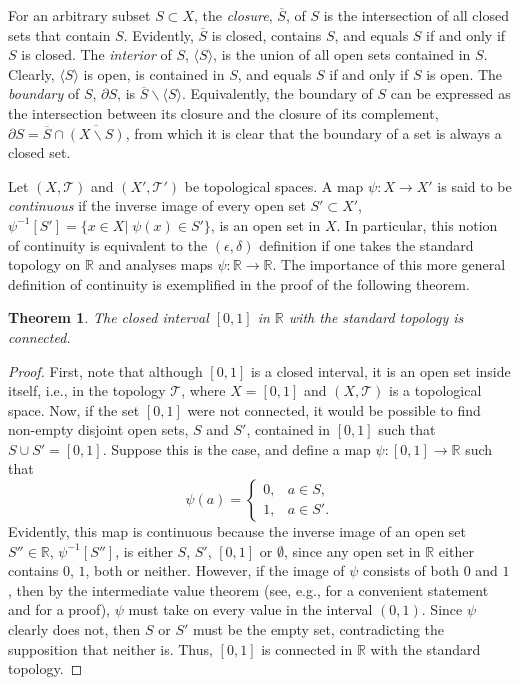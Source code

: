 \documentclass[
12pt,		%
openright,	%
twoside,  %
a4paper,			%
chapter=TITLE,		%
english,			%
french,				%
spanish,			%
brazil				%
]{USPSC-classe/USPSC}
\newtheorem{theorem}{Theorem}[section]
\begin{document}
\begin{apendicesenv}
For an arbitrary subset $S\subset X$, the \textit{closure}, $\overline{S}$, of $S$ is the intersection of all closed sets that contain $S$. Evidently, $\overline{S}$ is closed, contains $S$, and equals $S$ if and only if $S$ is closed. The \textit{interior} of $S$, $\langle S\rangle$, is the union of all open sets contained in $S$. Clearly, $\langle S\rangle$ is open, is contained in $S$, and equals $S$ if and only if $S$ is open. The \textit{boundary} of $S$, $\partial S$, is $\overline{S}\backslash\langle S\rangle$. Equivalently, the boundary of $S$ can be expressed as the intersection between its closure and the closure of its complement, $\partial S=\overline{S}\cap\overline{(X\backslash S)}$, from which it is clear that the boundary of a set is always a closed set.

Let $(X,\mathscr{T})$ and $(X',\mathscr{T}')$ be topological spaces. A map $\psi:X\to X'$ is said to be \textit{continuous} if the inverse image of every open set $S'\subset X'$, $\psi^{-1}[S']=\{x\in X|\;\psi(x)\in S'\}$, is an open set in $X$. In particular, this notion of continuity is equivalent to the $(\epsilon,\delta)$ definition \cite{Leithold1976} if one takes the standard topology on $\mathbb{R}$ and analyses maps $\psi:\mathbb{R}\to\mathbb{R}$. The importance of this more general definition of continuity is exemplified in the proof of the following theorem.

\begin{theorem}\label{01}
    The closed interval $[0,1]$ in $\mathbb{R}$ with the standard topology is connected.
\end{theorem}
\begin{proof}
    First, note that although  $[0,1]$ is a closed interval, it is an open set inside itself, i.e., in the topology $\mathscr{T}$, where $X=[0,1]$ and $(X,\mathscr{T})$ is a topological space. Now, if the set $[0,1]$ were not connected, it would be possible to find non-empty disjoint open sets, $S$ and $S'$, contained in $[0,1]$ such that $S\cup S'=[0,1]$. Suppose this is the case, and define a map $\psi:[0,1]\to\mathbb{R}$ such that
    \begin{equation}
        \psi(a)=
        \begin{cases}
      0, & a\in S, \\
      1, & a\in S'.
    \end{cases}
    \end{equation}
    Evidently, this map is continuous because the inverse image of an open set $S''\in\mathbb{R}$, $\psi^{-1}[S'']$, is either $S$, $S'$, $[0,1]$ or $\emptyset$, since any open set in $\mathbb{R}$ either contains $0$, $1$, both or neither. However, if the image of $\psi$ consists of both $0$ and $1$, then by the intermediate value theorem (see, e.g., \cite{Stewart2007} for a convenient statement and \cite{Ghorpade2006} for a proof), $\psi$ must take on every value in the interval $(0,1)$. Since $\psi$ clearly does not, then $S$ or $S'$ must be the empty set, contradicting the supposition that neither is. Thus, $[0,1]$ is connected in $\mathbb{R}$ with the standard topology.
\end{proof}


\end{apendicesenv}
\end{document}
